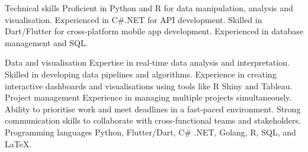 \begin{cvskills}
  \cvskill
    {Technical skills} %
    {
    Proficient in Python and R for data manipulation, analysis and visualisation.\newline
    Experienced in C\#.NET for API development.\newline
    Skilled in Dart/Flutter for cross-platform mobile app development.\newline
    Experienced in database management and SQL.
    }

    \cvskill
    {Data and visualisation}
    {
        Expertise in real-time data analysis and interpretation.\newline
        Skilled in developing data pipelines and algorithms.\newline
        Experience in creating interactive dashboards and visualisations using tools like R Shiny and Tableau.
    }
    \cvskill
    {Project management}
    {
        Experience in managing multiple projects simultaneously.\newline
        Ability to prioritise work and meet deadlines in a fast-paced environment.\newline
        Strong communication skills to collaborate with cross-functional teams and stakeholders.
    }
    \cvskill
    {Programming languages}
    {
        Python, Flutter/Dart, C\# .NET, Golang, R, SQL, and LaTeX.
    }

\end{cvskills}





